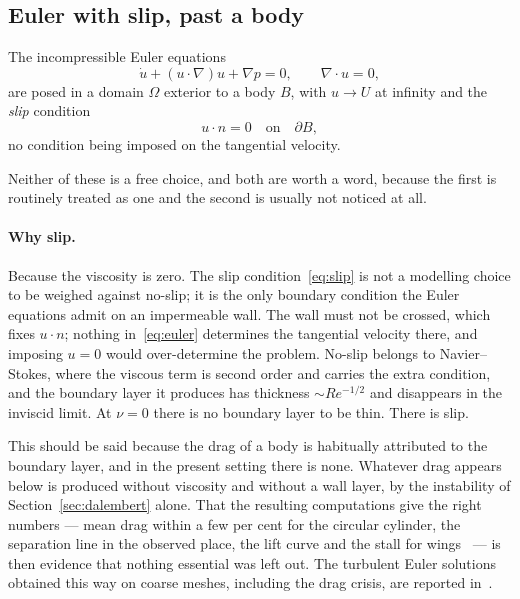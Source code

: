 \documentclass[11pt]{article}
\newcommand{\grad}{\nabla}
\begin{document}
\subsection{Euler with slip, past a body}\label{sec:eqns}

The incompressible Euler equations
\begin{equation}\label{eq:euler}
\dot u + (u\cdot\grad)u + \grad p = 0,\qquad \grad\cdot u = 0,
\end{equation}
are posed in a domain $\Omega$ exterior to a body $B$, with $u\to U$ at infinity and the
\emph{slip} condition
\begin{equation}\label{eq:slip}
u\cdot n = 0 \quad\text{on}\quad \partial B,
\end{equation}
no condition being imposed on the tangential velocity.

Neither of these is a free choice, and both are worth a word, because the first is routinely
treated as one and the second is usually not noticed at all.

\paragraph{Why slip.} Because the viscosity is zero. The slip
condition~\eqref{eq:slip} is not a modelling choice to be weighed against no-slip; it is the only
boundary condition the Euler equations admit on an impermeable wall. The wall must not be crossed,
which fixes $u\cdot n$; nothing in~\eqref{eq:euler} determines the tangential velocity there, and
imposing $u=0$ would over-determine the problem. No-slip belongs to Navier--Stokes, where the
viscous term is second order and carries the extra condition, and the boundary layer it produces has
thickness $\sim Re^{-1/2}$ and disappears in the inviscid limit. At $\nu=0$ there is no boundary
layer to be thin. There is slip.

This should be said because the drag of a body is habitually attributed to the boundary layer, and
in the present setting there is none. Whatever drag appears below is produced without viscosity and
without a wall layer, by the instability of Section~\ref{sec:dalembert} alone. That the resulting
computations give the right numbers --- mean drag within a few per cent for the circular cylinder,
the separation line in the observed place, the lift curve and the stall for
wings~\cite{drag,flight} --- is then evidence that nothing essential was left out. The
turbulent Euler solutions obtained this way on coarse meshes, including the drag crisis, are
reported in~\cite{dragcrisis}.
\end{document}
